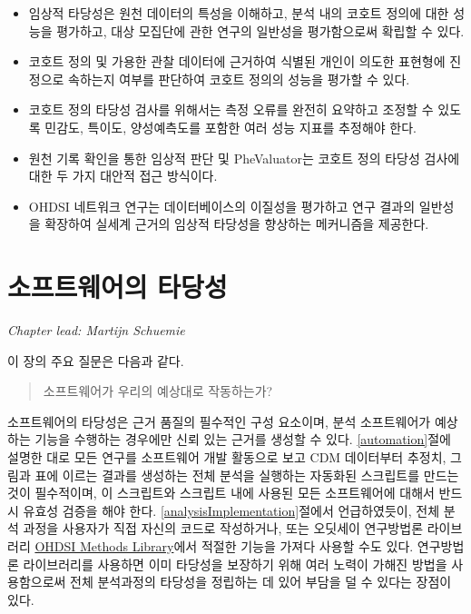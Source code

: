 \documentclass[10.5pt]{book}
\providecommand{\tightlist}{%
  \setlength{\itemsep}{0pt}\setlength{\parskip}{0pt}}
\theoremstyle{definition}
\theoremstyle{definition}
\theoremstyle{definition}
\theoremstyle{remark}
\let\BeginKnitrBlock\begin \let\EndKnitrBlock\end
\begin{document}
\BeginKnitrBlock{rmdsummary}
\begin{itemize}
\tightlist
\item
  임상적 타당성은 원천 데이터의 특성을 이해하고, 분석 내의 코호트 정의에
  대한 성능을 평가하고, 대상 모집단에 관한 연구의 일반성을 평가함으로써
  확립할 수 있다.
\item
  코호트 정의 및 가용한 관찰 데이터에 근거하여 식별된 개인이 의도한
  표현형에 진정으로 속하는지 여부를 판단하여 코호트 정의의 성능을 평가할
  수 있다.
\item
  코호트 정의 타당성 검사를 위해서는 측정 오류를 완전히 요약하고 조정할
  수 있도록 민감도, 특이도, 양성예측도를 포함한 여러 성능 지표를
  추정해야 한다.
\item
  원천 기록 확인을 통한 임상적 판단 및 PheValuator는 코호트 정의 타당성
  검사에 대한 두 가지 대안적 접근 방식이다.
\item
  OHDSI 네트워크 연구는 데이터베이스의 이질성을 평가하고 연구 결과의
  일반성을 확장하여 실세계 근거의 임상적 타당성을 향상하는 메커니즘을
  제공한다.
\end{itemize}
\EndKnitrBlock{rmdsummary}

\chapter{소프트웨어의 타당성}\label{SoftwareValidity}

\emph{Chapter lead: Martijn Schuemie}

이 장의 주요 질문은 다음과 같다.

\begin{quote}
소프트웨어가 우리의 예상대로 작동하는가?
\end{quote}

소프트웨어의 타당성은 근거 품질의 필수적인 구성 요소이며, 분석
소프트웨어가 예상하는 기능을 수행하는 경우에만 신뢰 있는 근거를 생성할
수 있다. \ref{automation}절에 설명한 대로 모든 연구를 소프트웨어 개발
활동으로 보고 CDM 데이터부터 추정치, 그림과 표에 이르는 결과를 생성하는
전체 분석을 실행하는 자동화된 스크립트를 만드는 것이 필수적이며, 이
스크립트와 스크립트 내에 사용된 모든 소프트웨어에 대해서 반드시 유효성
검증을 해야 한다. \ref{analysisImplementation}절에서 언급하였듯이, 전체
분석 과정을 사용자가 직접 자신의 코드로 작성하거나, 또는 오딧세이
연구방법론 라이브러리
\href{https://ohdsi.github.io/MethodsLibrary/}{OHDSI Methods
Library}에서 적절한 기능을 가져다 사용할 수도 있다. 연구방법론
라이브러리를 사용하면 이미 타당성을 보장하기 위해 여러 노력이 가해진
방법을 사용함으로써 전체 분석과정의 타당성을 정립하는 데 있어 부담을 덜
수 있다는 장점이 있다. 
\end{document}
